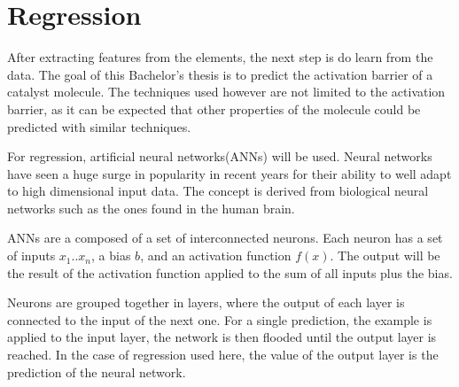 
\chapter{Regression}
\label{ch:Regression}

After extracting features from the elements, the next step is do learn from the data.
The goal of this Bachelor's thesis is to predict the activation barrier of a catalyst molecule.
The techniques used however are not limited to the activation barrier, 
as it can be expected that other properties of the molecule could be predicted with similar techniques.

For regression, artificial neural networks(ANNs) will be used.
Neural networks have seen a huge surge in popularity in recent years for their ability to well
adapt to high dimensional input data.
The concept is derived from biological neural networks such as the ones found in the human brain.

ANNs are a composed of a set of interconnected neurons.
Each neuron has a set of inputs $x_1 .. x_n$, a bias $b$, and an activation function $f(x)$.
The output will be the result of the activation function applied to the sum of all inputs plus the bias.

Neurons are grouped together in layers, where the output of each layer is connected to the input of the next one.
For a single prediction, the example is applied to the input layer, the network is then flooded until the output layer is reached.
In the case of regression used here, the value of the output layer is the prediction of the neural network.

